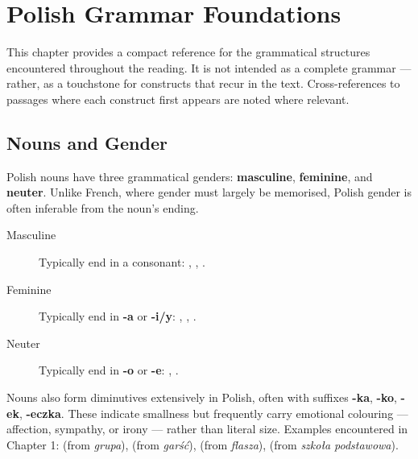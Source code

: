 
\chapter*{Polish Grammar Foundations}

This chapter provides a compact reference for the grammatical structures 
encountered throughout the reading. It is not intended as a complete grammar 
— rather, as a touchstone for constructs that recur in the text. Cross-references 
to passages where each construct first appears are noted where relevant.

\section{Nouns and Gender}

Polish nouns have three grammatical genders: \textbf{masculine}, \textbf{feminine}, 
and \textbf{neuter}. Unlike French, where gender must largely be memorised, Polish 
gender is often inferable from the noun's ending.

\begin{description}
  \item[Masculine] Typically end in a consonant: , 
    , .
  \item[Feminine] Typically end in \textbf{-a} or \textbf{-i/y}: 
    , , 
    .
  \item[Neuter] Typically end in \textbf{-o} or \textbf{-e}: 
    , .
\end{description}


Nouns also form diminutives extensively in Polish, often with suffixes 
\textbf{-ka}, \textbf{-ko}, \textbf{-ek}, \textbf{-eczka}. These indicate 
smallness but frequently carry emotional colouring — affection, sympathy, or 
irony — rather than literal size. Examples encountered in Chapter 1: 
 (from \textit{grupa}), 
 (from \textit{garść}), 
 (from \textit{flasza}),
 (from \textit{szkoła podstawowa}).

